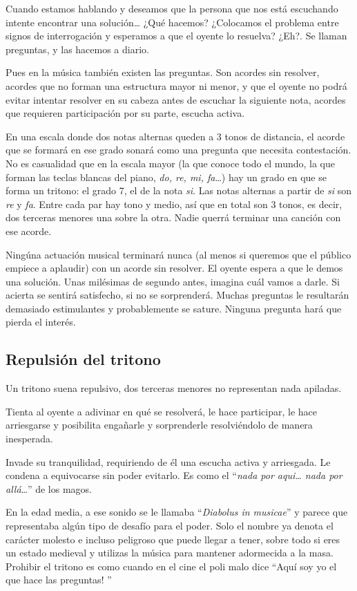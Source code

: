 \documentclass[]{report}
\begin{document}
Cuando estamos hablando y deseamos que la persona que nos está escuchando intente encontrar una solución\ldots{} ¿Qué hacemos? ¿Colocamos el problema entre signos de interrogación y esperamos a que el oyente lo resuelva? ¿Eh?. Se llaman preguntas, y las hacemos a diario.

Pues en la música también existen las preguntas. Son acordes sin resolver, acordes que no forman una estructura mayor ni menor, y que el oyente no podrá evitar intentar resolver en su cabeza antes de escuchar la siguiente nota, acordes que requieren participación por su parte, escucha activa.

En una escala donde dos notas alternas queden a 3 tonos de distancia, el acorde que se formará en ese grado sonará como una pregunta que necesita contestación. No es casualidad que en la escala mayor (la que conoce todo el mundo, la que forman las teclas blancas del piano, \emph{do, re,   mi, fa}\ldots) hay un grado en que se forma un tritono: el grado 7, el de la nota \emph{si}. Las notas alternas a partir de \emph{si} son \emph{re} y \emph{fa}. Entre cada par hay tono y medio, así que en total son 3 tonos, es decir, dos terceras menores una sobre la otra. Nadie querrá terminar una canción con ese acorde.

Ningúna actuación musical terminará nunca (al menos si queremos que el público empiece a aplaudir) con un acorde sin resolver. El oyente espera a que le demos una solución. Unas milésimas de segundo antes, imagina cuál vamos a darle. Si acierta se sentirá satisfecho, si no se sorprenderá. Muchas preguntas le resultarán demasiado estimulantes y probablemente se sature. Ninguna pregunta hará que pierda el interés.

\subsection{Repulsión del tritono}

Un tritono suena repulsivo, dos terceras menores no representan nada apiladas.

Tienta al oyente a adivinar en qué se resolverá, le hace participar, le hace arriesgarse y posibilita engañarle y sorprenderle resolviéndolo de manera inesperada.

Invade su tranquilidad, requiriendo de él una escucha activa y arriesgada. Le condena a equivocarse sin poder evitarlo. Es como el ``\emph{nada por aqui\ldots{}   nada por allá}\ldots{}'' de los magos.

En la edad media, a ese sonido se le llamaba ``\emph{Diabolus in musicae}'' y parece que representaba algún tipo de desafío para el poder. Solo el nombre ya denota el carácter molesto e incluso peligroso que puede llegar a tener, sobre todo si eres un estado medieval y utilizas la música para mantener adormecida a la masa. Prohibir el tritono es como cuando en el cine el poli malo dice ``Aquí soy yo el que hace las preguntas! ''
\end{document}

